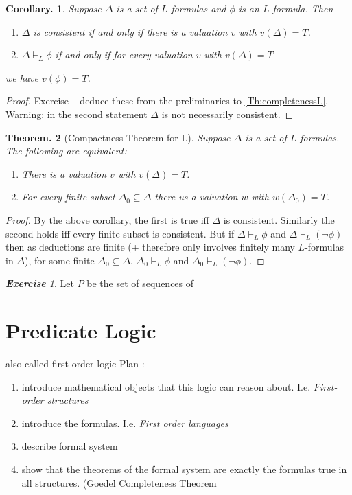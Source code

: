 \documentclass[a4paper,oneside,11pt,DIV=12,parskip=half]{scrartcl}
\theoremstyle{plain}
\newtheorem{theorem}{Theorem.}[section]
\newtheorem{corollary}[theorem]{Corollary.}
\theoremstyle{definition}
\newtheorem{remark, definition}[theorem]{Remark and Definition.}
\newtheorem{lemma, definition}[theorem]{Lemma and Definition.}
\newtheorem{theorem, definition}[theorem]{Theorem and Definition.}
\theoremstyle{remark}
\newtheorem*{exercise}{\textbf{Exercise}}
\newtheorem*{remark, example}{\textbf{Remark and Exercise}}
\begin{document}
\begin{corollary}
 Suppose $\Delta$ is a set of $L$-formulas and $\phi$ is an $L$-formula. Then
 \begin{enumerate}
     \item $\Delta$ is consistent if and only if there is a valuation $v$ with $v(\Delta) =T$.
     \item $\Delta \vdash_L \phi$ if and only if for every valuation $v$ with $v(\Delta) = T$
 \end{enumerate} we have $v(\phi) = T$.
\end{corollary}
\begin{proof}
 Exercise -- deduce these from the preliminaries to \ref{Th:completenessL}. Warning: in the second statement $\Delta$ is not necessarily consistent.
\end{proof}

\begin{theorem}[Compactness Theorem for L]
Suppose $\Delta$ is a set of $L$-formulas. The following are equivalent:
\begin{enumerate}
    \item There is a valuation $v$ with $v(\Delta) = T$.
    \item For every finite subset $\Delta_0 \subseteq \Delta$ there us a valuation $w$ with $w(\Delta_0) = T$.
\end{enumerate}
\end{theorem}

\begin{proof}
By the above corollary, the first is true iff $\Delta$ is consistent.
Similarly the second holds iff every finite subset is consistent.
But if $\Delta \vdash_L \phi$ and $\Delta \vdash_L (\lnot \phi)$ then as deductions are finite (+ therefore only involves finitely many $L$-formulas in $\Delta$), for some finite $\Delta_0 \subseteq \Delta$, $\Delta_0 \vdash_L \phi$ and $\Delta_0 \vdash_L (\lnot \phi)$.
\end{proof}

\begin{exercise}
Let $P$ be the set of sequences of 
\end{exercise}

\section{Predicate Logic}
also called first-order logic
Plan :
\begin{enumerate}
    \item introduce mathematical objects that this logic can reason about. I.e. \emph{First-order structures}
    \item introduce the formulas. I.e. \emph{First order languages}
    \item describe  formal system
    \item show that the theorems of the formal system are exactly the formulas true in all structures. (Goedel Completeness Theorem
\end{enumerate}
\end{document}
